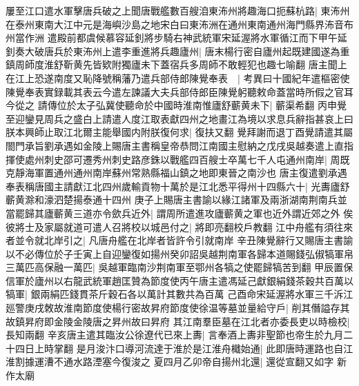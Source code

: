 屢至江口遣水軍擊唐兵破之上聞唐戰艦數百艘洎東㳍州將趣海口扼蘇杭路|{
	東㳍州在泰州東南大江中元是海嶼沙島之地宋白曰東㳍洲在通州東南通州海門縣界㳍音布州當作洲}
遣殿前都虞候慕容延釗將步騎右神武統軍宋延渥將水軍循江而下甲午延釗奏大破唐兵於東㳍州上遣李重進將兵趣廬州|{
	唐末楊行密自廬州起既建國遂為重鎮周師度淮舒靳黄先皆欵附獨廬未下蓋宿兵多周師不敢輕犯也趣七喻翻}
唐主聞上在江上恐遂南度又恥降號稱藩乃遣兵部侍郎陳覺奉表　|{
	考異曰十國紀年遣樞密使陳覺奉表實録載其表云今遣左諫議大夫兵部侍郎臣陳覺躬聽敕命蓋當時所假之官耳今從之}
請傳位於太子弘冀使聽命於中國時淮南惟廬舒蘄黄未下|{
	蘄渠希翻}
丙申覺至迎鑾見周兵之盛白上請遣人度江取表獻四州之地畫江為境以求息兵辭指甚哀上曰朕本興師止取江北爾主能舉國内附朕復何求|{
	復扶又翻}
覺拜謝而退丁酉覺請遣其屬閤門承旨劉承遇如金陵上賜唐主書稱皇帝恭問江南國主慰納之戊戌吳越奏遣上直指揮使處州刺史邵可遷秀州刺史路彦銖以戰艦四百艘士卒萬七千人屯通州南岸|{
	周既克靜海軍置通州通州南岸蘇州常熟縣福山鎮之地即東晉之南沙也}
唐主復遣劉承遇奉表稱唐國主請獻江北四州歲輸貢物十萬於是江北悉平得州十四縣六十|{
	光夀廬舒蘄黄滁和濠泗楚揚泰通十四州}
庚子上賜唐主書諭以緣江諸軍及兩浙湖南荆南兵並當罷歸其廬蘄黄三道亦令歛兵近外|{
	謂周所遣進攻廬蘄黄之軍也近外謂近郊之外}
俟彼將士及家屬就道可遣人召將校以城邑付之|{
	將即亮翻校戶教翻}
江中舟艦有須往來者並令就北岸引之|{
	凡唐舟艦在北岸者皆許令引就南岸}
辛丑陳覺辭行又賜唐主書諭以不必傳位於子壬寅上自迎鑾復如揚州癸卯詔吳越荆南軍各歸本道賜錢弘俶犒軍帛三萬匹高保融一萬匹|{
	吳越軍臨南沙荆南軍至鄂州各犒之使罷歸犒苦到翻}
甲辰置保信軍於廬州以右龍武統軍趙匡贊為節度使丙午唐主遣馮延己獻銀絹錢茶穀共百萬以犒軍|{
	銀兩絹匹錢貫茶斤穀石各以萬計其數共為百萬}
己酉命宋延渥將水軍三千泝江廵警庚戌敇故淮南節度使楊行密故昇府節度使徐温等墓並量給守戶|{
	削其僭謚存其故鎮昇府即金陵金陵唐之昇州故曰昇府}
其江南羣臣墓在江北者亦委長吏以時檢校|{
	長知兩翻}
辛亥唐主遣其臨汝公徐遼代已來上夀|{
	言奉酒上夀非聖節也帝生於九月二十四日上時掌翻}
是月浚汴口導河流達于淮於是江淮舟檝始通|{
	此即唐時運路也自江淮割據運漕不通水路湮塞今復浚之}
夏四月乙卯帝自揚州北還|{
	還從宣翻又如字}
新作太廟

